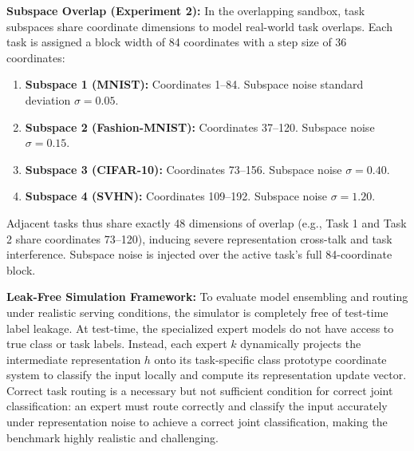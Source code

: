 \textbf{Subspace Overlap (Experiment 2):} In the overlapping sandbox, task subspaces share coordinate dimensions to model real-world task overlaps. Each task is assigned a block width of 84 coordinates with a step size of 36 coordinates:
\begin{enumerate}
  \item \textbf{Subspace 1 (MNIST):} Coordinates 1--84. Subspace noise standard deviation $\sigma = 0.05$.
  \item \textbf{Subspace 2 (Fashion-MNIST):} Coordinates 37--120. Subspace noise $\sigma = 0.15$.
  \item \textbf{Subspace 3 (CIFAR-10):} Coordinates 73--156. Subspace noise $\sigma = 0.40$.
  \item \textbf{Subspace 4 (SVHN):} Coordinates 109--192. Subspace noise $\sigma = 1.20$.
\end{enumerate}
Adjacent tasks thus share exactly 48 dimensions of overlap (e.g., Task 1 and Task 2 share coordinates 73--120), inducing severe representation cross-talk and task interference. Subspace noise is injected over the active task's full 84-coordinate block.

\textbf{Leak-Free Simulation Framework:}
To evaluate model ensembling and routing under realistic serving conditions, the simulator is completely free of test-time label leakage. At test-time, the specialized expert models do not have access to true class or task labels. Instead, each expert $k$ dynamically projects the intermediate representation $h$ onto its task-specific class prototype coordinate system to classify the input locally and compute its representation update vector. Correct task routing is a necessary but not sufficient condition for correct joint classification: an expert must route correctly and classify the input accurately under representation noise to achieve a correct joint classification, making the benchmark highly realistic and challenging.


